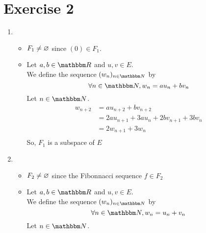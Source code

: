 \part{Exercise 2}

\begin{enumerate}
	\item
		\begin{itemize}
			\item $F_1 \neq \varnothing$ since $(0) \in F_1$.
			\item Let $a,b \in \R$ and $u,v \in E$.\\
				We define the sequence $(w_n)_{n\in\N}$ by  \[
					\forall n \in \N, w_n = au_n + bv_n
				\]
				Let $n\in \N$.
				\begin{align*}
					w_{n+2} &= au_{n+2} + bv_{n+2}\\
					&= 2au_{n+1} + 3au_n + 2bv_{n+1} + 3bv_n \\
					&= 2w_{n+1} + 3w_n\\
				\end{align*}
				So, $F_1$ is a subspace of $E$
		\end{itemize}
	\item
		\begin{itemize}
			\item $F_2 \neq \varnothing$ since the Fibonnacci sequence $f \in F_2$
			\item Let $a,b \in \R$ and $u,v \in E$.\\
				We define the sequence $(w_n)_{n\in\N}$ by  \[
					\forall n \in \N, w_n = u_n + v_n
				\]
				Let $n\in \N$.
		\end{itemize}
\end{enumerate}

